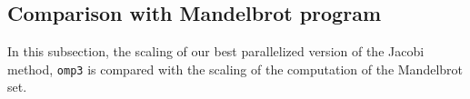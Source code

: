 \subsection{Comparison with Mandelbrot program}
In this subsection, the scaling of our best parallelized version of the Jacobi method, \texttt{omp3} is compared with the scaling of the computation of the Mandelbrot set.